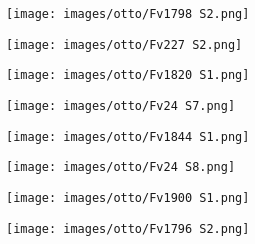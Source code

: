 
\begin{figure}[H]
    \centering
    \texttt{[image: images/otto/Fv1798 S2.png]}
\end{figure}
            
\begin{figure}[H]
    \centering
    \texttt{[image: images/otto/Fv227 S2.png]}
\end{figure}
            
\begin{figure}[H]
    \centering
    \texttt{[image: images/otto/Fv1820 S1.png]}
\end{figure}
            
\begin{figure}[H]
    \centering
    \texttt{[image: images/otto/Fv24 S7.png]}
\end{figure}
            
\begin{figure}[H]
    \centering
    \texttt{[image: images/otto/Fv1844 S1.png]}
\end{figure}
            
\begin{figure}[H]
    \centering
    \texttt{[image: images/otto/Fv24 S8.png]}
\end{figure}
            
\begin{figure}[H]
    \centering
    \texttt{[image: images/otto/Fv1900 S1.png]}
\end{figure}
            
\begin{figure}[H]
    \centering
    \texttt{[image: images/otto/Fv1796 S2.png]}
\end{figure}
            